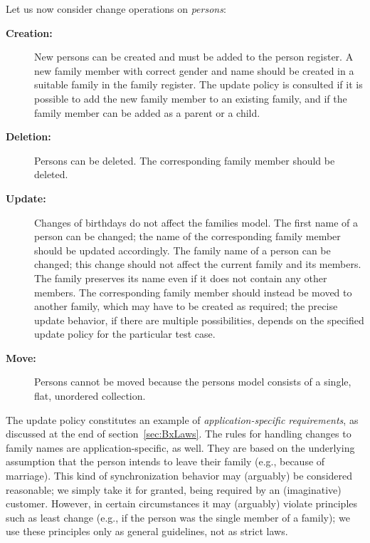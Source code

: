 \medskip
\noindent Let us now consider change operations on \emph{persons}:
%
\begin{description}
    \item[\textbf{Creation:}]
    New persons can be created and must be added to the person register.
    A new family member with correct gender and name should be created in a suitable family in the family register.
    The update policy is consulted if it is possible to add the new family member to an existing family, and if the family member can be added as a parent or a child.
    
    \item[\textbf{Deletion:}]
    Persons can be deleted.
    The corresponding family member should be deleted. 

    \item[\textbf{Update:}]
    Changes of birthdays do not affect the families model. 
%
    The first name of a person can be changed; 
    the name of the corresponding family member should be updated accordingly. 
%
    The family name of a person can be changed; 
    this change should not affect the current family and its members.
    The family preserves its name even if it does not contain any other members.
    The corresponding family member should instead be moved to another family, which may have to be created as required; the precise update behavior, if there are multiple possibilities, depends on the specified update policy for the particular test case.
    
    \item[\textbf{Move:}]
    Persons cannot be moved because the persons model consists of a single, flat, unordered collection. 
\end{description}

The update policy constitutes an example of \emph{ap\-pli\-ca\-tion-specific requirements}, as discussed at the end of section~\ref{sec:BxLaws}. The rules for handling changes to family names are application-specific, as well. They are based on the underlying assumption that the person intends to leave their family (e.g., because of marriage).
This kind of synchronization behavior may (arguably) be considered reasonable; we simply take it for granted, being required by an (imaginative) customer.
However, in certain circumstances it may (arguably) violate principles such as least change (e.g., if the person was the single member of a family); we use these principles only as general guidelines, not as strict laws. 


